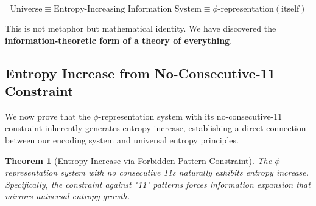 \documentclass[12pt,letterpaper]{article}
\newtheorem{theorem}{Theorem}[section]
\begin{document}
$$\text{Universe} \equiv \text{Entropy-Increasing Information System} \equiv \phi\text{-representation}(\text{itself})$$

This is not metaphor but mathematical identity. We have discovered the \textbf{information-theoretic form of a theory of everything}.

\subsection{Entropy Increase from No-Consecutive-11 Constraint}

We now prove that the $\phi$-representation system with its no-consecutive-11 constraint inherently generates entropy increase, establishing a direct connection between our encoding system and universal entropy principles.

\begin{theorem}[Entropy Increase via Forbidden Pattern Constraint]
\label{thm:entropy_no_11}
The $\phi$-representation system with no consecutive 11s naturally exhibits entropy increase. Specifically, the constraint against "11" patterns forces information expansion that mirrors universal entropy growth.
\end{theorem}
\end{document}
